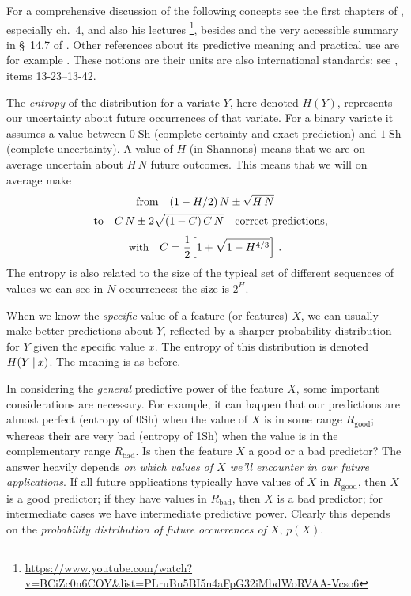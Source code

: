 \documentclass[\ifafour a4paper,12pt,\else a5paper,10pt,\fi%
onecolumn,oneside,article,%
british%
]{memoir}
\theoremstyle{remark}
\theoremstyle{innote}
\providecommand{\href}[2]{#2}
\renewcommand*{\|}[1][]{\nonscript\:#1\vert\nonscript\:\mathopen{}}
\newcommand*{\sect}{\S}%
\newcommand*{\chap}{ch.}%
\newcommand*{\bit}{\textrm{Sh}}
\begin{document}
For a comprehensive discussion of the following concepts see the first
chapters of \textcite{mackay1995_r2005}, especially \chap~4, and also his
lectures
\footnote{\url{https://www.youtube.com/watch?v=BCiZc0n6COY&list=PLruBu5BI5n4aFpG32iMbdWoRVAA-Vcso6}},
besides \textcite{shannon1948} and the very accessible summary in
\sect~14.7 of \textcite{pressetal1986_r2007}. Other references about its
predictive meaning and practical use are for example
\textcite{lindley1956,kullback1959_r1978,woodward1953_r1964}. These notions
are their units are also international standards: see \textcite{iso2008c},
items 13-23--13-42.

The \emph{entropy} of the distribution for a variate $Y$, here denoted
$H(Y)$, represents our uncertainty about future occurrences of that
variate. For a binary variate it assumes a value between $0\;\bit$
(complete certainty and exact prediction) and $1\;\bit$ (complete
uncertainty). A value of $H$ (in Shannons) means that we are on average
uncertain about  $H\,N$ future outcomes. This means that we will on average make
\begin{multline}
  \label{eq:entropy_est}
    \text{from}\quad
    (1-H/2)\,N \pm \sqrt{H\,N}\\
    \shoveleft{
    \text{to}\quad    C\,N \pm 2\sqrt{(1-C)\,C\,N}
      \quad\text{correct predictions,}
      }
    \\[1\jot]
    \text{\small with}\quad C = \frac{1}{2}\Bigl[1+\sqrt{1-H^{4/3}}\Bigr] \ .
\end{multline}
The entropy is also related to the size of the typical
set of different sequences of values we can see in $N$ occurrences: the
size is $2^{H}$.

When we know the \emph{specific} value of a feature (or features) $X$, we
can usually make better predictions about $Y$, reflected by a sharper
probability distribution for $Y$ given the specific value $x$. The entropy
of this distribution is denoted $H(Y\|x)$. The meaning is as before.

In considering the \emph{general} predictive power of the feature $X$, some
important considerations are necessary. For example, it can happen that our
predictions are almost perfect (entropy of 0\;\bit) when the value of $X$
is in some range $R_{\text{good}}$; whereas their are very bad (entropy of
1\;\bit) when the value is in the complementary range $R_{\text{bad}}$. Is
then the feature $X$ a good or a bad predictor? The answer heavily depends
\emph{on which values of $X$ we'll encounter in our future applications}.
If all future applications typically have values of $X$ in
$R_{\text{good}}$, then $X$ is a good predictor; if they have values in
$R_{\text{bad}}$, then $X$ is a bad predictor; for intermediate cases we
have intermediate predictive power. Clearly this depends on the
\emph{probability distribution of future occurrences of $X$}, $p(X)$.
\end{document}
